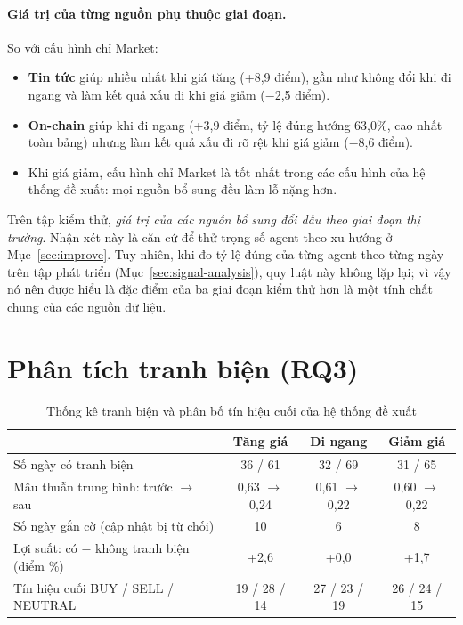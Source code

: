 \paragraph{Giá trị của từng nguồn phụ thuộc giai đoạn.} So với cấu hình chỉ Market:
\begin{itemize}
  \item \textbf{Tin tức} giúp nhiều nhất khi giá tăng (+8,9 điểm), gần như không đổi khi đi ngang và làm kết quả xấu đi
  khi giá giảm ($-$2,5 điểm).
  \item \textbf{On-chain} giúp khi đi ngang (+3,9 điểm, tỷ lệ đúng hướng 63,0\%, cao nhất toàn bảng) nhưng làm kết quả
  xấu đi rõ rệt khi giá giảm ($-$8,6 điểm).
  \item Khi giá giảm, cấu hình chỉ Market là tốt nhất trong các cấu hình của hệ thống đề xuất: mọi nguồn bổ sung đều làm
  lỗ nặng hơn.
\end{itemize}
Trên tập kiểm thử, \emph{giá trị của các nguồn bổ sung đổi dấu theo giai đoạn thị trường}. Nhận xét này là căn cứ để thử
trọng số agent theo xu hướng ở Mục~\ref{sec:improve}. Tuy nhiên, khi đo tỷ lệ đúng của từng agent theo từng ngày trên
tập phát triển (Mục~\ref{sec:signal-analysis}), quy luật này không lặp lại; vì vậy nó nên được hiểu là đặc điểm của ba
giai đoạn kiểm thử hơn là một tính chất chung của các nguồn dữ liệu.

\section{Phân tích tranh biện (RQ3)}
\label{sec:debate-analysis}

\begin{table}[H]
\centering
\caption{Thống kê tranh biện và phân bố tín hiệu cuối của hệ thống đề xuất}
\label{tab:debate}
\begin{tabular}{lccc}
\toprule
 & Tăng giá & Đi ngang & Giảm giá \\
\midrule
Số ngày có tranh biện & 36 / 61 & 32 / 69 & 31 / 65 \\
Mâu thuẫn trung bình: trước $\rightarrow$ sau & 0,63 $\rightarrow$ 0,24 & 0,61 $\rightarrow$ 0,22 & 0,60 $\rightarrow$ 0,22 \\
Số ngày gắn cờ (cập nhật bị từ chối) & 10 & 6 & 8 \\
Lợi suất: có $-$ không tranh biện (điểm \%) & +2,6 & +0,0 & +1,7 \\
Tín hiệu cuối BUY / SELL / NEUTRAL & 19 / 28 / 14 & 27 / 23 / 19 & 26 / 24 / 15 \\
\bottomrule
\end{tabular}
\end{table}

